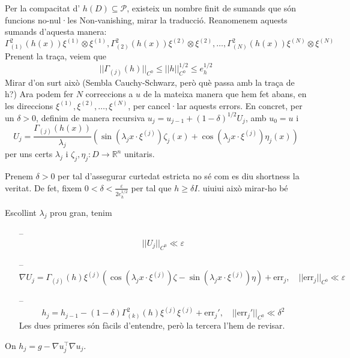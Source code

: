 Per la compacitat d' $h(D)\subseteq\mathcal P$, existeix un nombre finit de sumands que són funcions no-nul·les{\color{blue} Non-vanishing, mirar la traducció}. Reanomenem aquests sumands d'aquesta manera:
\begin{equation*}
    \Gamma^2_{(1)}(h(x))\xi^{(1)}\otimes\xi^{(1)}, \Gamma^2_{(2)}(h(x))\xi^{(2)}\otimes\xi^{(2)}, \dots, \Gamma^2_{(N)}(h(x))\xi^{(N)}\otimes\xi^{(N)}
\end{equation*}
Prenent la traça, veiem que 
\begin{equation*}
    ||\Gamma_{(j)}(h)||_{C^0} \le ||h||_{C^0}^{1/2} \le e_h^{1/2}
\end{equation*}
{\color{blue} Mirar d'on surt això (Sembla Cauchy-Schwarz, però què passa amb la traça de h?)}
Ara podem fer $N$ correccions a $u$ de la mateixa manera que hem fet abans, en les direccions $\xi^{(1)}, \xi^{(2)}, \dots, \xi^{(N)}$, per cancel·lar aquests errors. En concret, per un $\delta>0$, definim de manera recursiva $u_j = u_{j-1}+(1-\delta)^{1/2}U_j$, amb $u_0 = u$ i 
\begin{equation*}
    U_j = \frac{\Gamma_{(j)}(h(x))}{\lambda_j}\left( \sin(\lambda_j x\cdot\xi^{(j)})\zeta_j(x) + \cos(\lambda_j x\cdot\xi^{(j)})\eta_j(x) \right)
\end{equation*}
per uns certs $\lambda_j$ i $\zeta_j, \eta_j:D\to\mathbb R^n$ unitaris.

Prenem $\delta > 0$ per tal d'assegurar curtedat estricta {\color{blue} no sé com es diu shortness la veritat}. De fet, fixem $0<\delta<\frac{\varepsilon}{2e_h^{1/2}}$ per tal que $h\ge\delta I$. {\color{blue} uiuiui això mirar-ho bé}

Escollint $\lambda_j$ prou gran, tenim
\begin{itemize}
    \item[--]
    \begin{equation}
        ||U_j||_{C^0} \ll \varepsilon
    \end{equation}
    \item[--]
    \begin{equation}
        \nabla U_j = \Gamma_{(j)}(h)\xi^{(j)}(\cos(\lambda_j x\cdot\xi^{(j)})\zeta - \sin(\lambda_j x\cdot\xi^{(j)})\eta) + \text{err}_j,\quad ||\text{err}_j||_{C^0} \ll \varepsilon
    \end{equation}
    \item[--]
    \begin{equation}
        h_j=h_{j-1}-(1-\delta)\Gamma^2_{(k)}(h)\xi^{(j)}\xi^{(j)} + \text{err}_j', \quad ||\text{err}_j'||_{C^0} \ll \delta^2
    \end{equation}
    {\color{blue} Les dues primeres són fàcils d'entendre, però la tercera l'hem de revisar.}
\end{itemize}
On $h_j=g-\nabla u_j ^{\intercal}\nabla u_j$. 

